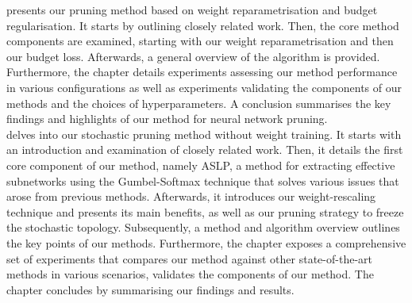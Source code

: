  presents our pruning method based on weight
reparametrisation and budget regularisation. It starts by outlining closely
related work. Then, the core method components are examined, starting with our
weight reparametrisation and then our budget loss. Afterwards, a general
overview of the algorithm is provided. Furthermore, the chapter details
experiments assessing our method performance in various configurations as well
as experiments validating the components of our methods and the choices of
hyperparameters. A conclusion summarises the key findings and highlights of our
method for neural network pruning.\\

 delves into our stochastic pruning method without weight
training. It starts with an introduction and examination of closely related
work. Then, it details the first core component of our method, namely
\acl{ASLP}, a method for extracting effective subnetworks using the
Gumbel-Softmax technique that solves various issues that arose from previous
methods. Afterwards, it introduces our weight-rescaling technique and presents
its main benefits, as well as our pruning strategy to freeze the stochastic
topology. Subsequently, a method and algorithm overview outlines the key points
of our methods. Furthermore, the chapter exposes a comprehensive set of
experiments that compares our method against other state-of-the-art methods in
various scenarios, validates the components of our method. The chapter concludes
by summarising our findings and results.\\